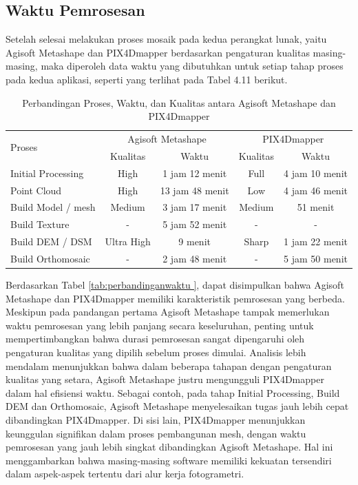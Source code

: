 \subsection{Waktu Pemrosesan}

Setelah selesai melakukan proses mosaik pada kedua perangkat lunak, yaitu Agisoft Metashape dan PIX4Dmapper berdasarkan pengaturan kualitas masing-masing, maka diperoleh data waktu yang dibutuhkan untuk setiap tahap proses pada kedua aplikasi, seperti yang terlihat pada Tabel 4.11 berikut.

\begin{table}[h]
\centering
\caption{Perbandingan Proses, Waktu, dan Kualitas antara Agisoft Metashape dan PIX4Dmapper}
\begin{tabular}{|l|c|c|c|c|}
\hline
\multirow{2}{*}{Proses} & \multicolumn{2}{c|}{Agisoft Metashape} & \multicolumn{2}{c|}{PIX4Dmapper} \\
\cline{2-5}
 & Kualitas & Waktu & Kualitas & Waktu \\
\hline
Initial Processing & High & 1 jam 12 menit & Full & 4 jam 10 menit \\
\hline
Point Cloud & High & 13 jam 48 menit & Low & 4 jam 46 menit \\
\hline
Build Model / mesh & Medium & 3 jam 17 menit & Medium & 51 menit \\
\hline
Build Texture & - & 5 jam 52 menit & - & - \\
\hline
Build DEM / DSM & Ultra High & 9 menit & Sharp & 1 jam 22 menit \\
\hline
Build Orthomosaic & - & 2 jam 48 menit & - & 5 jam 50 menit \\
\hline
\end{tabular}
\label{tab:perbandinganwaktu}
\end{table}

Berdasarkan Tabel \ref{tab:perbandinganwaktu
}, dapat disimpulkan bahwa Agisoft Metashape dan PIX4Dmapper memiliki karakteristik pemrosesan yang berbeda. Meskipun pada pandangan pertama Agisoft Metashape tampak memerlukan waktu pemrosesan yang lebih panjang secara keseluruhan, penting untuk mempertimbangkan bahwa durasi pemrosesan sangat dipengaruhi oleh pengaturan kualitas yang dipilih sebelum proses dimulai. Analisis lebih mendalam menunjukkan bahwa dalam beberapa tahapan dengan pengaturan kualitas yang setara, Agisoft Metashape justru mengungguli PIX4Dmapper dalam hal efisiensi waktu. Sebagai contoh, pada tahap Initial Processing, Build DEM dan Orthomosaic, Agisoft Metashape menyelesaikan tugas jauh lebih cepat dibandingkan PIX4Dmapper. Di sisi lain, PIX4Dmapper menunjukkan keunggulan signifikan dalam proses pembangunan mesh, dengan waktu pemrosesan yang jauh lebih singkat dibandingkan Agisoft Metashape. Hal ini menggambarkan bahwa masing-masing software memiliki kekuatan tersendiri dalam aspek-aspek tertentu dari alur kerja fotogrametri.

